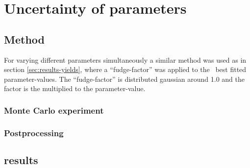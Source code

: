 \section{Uncertainty of parameters}

\subsection{Method}
For varying different parameters simultaneously a similar method was used as in section \ref{sec:results-yields}, where a ``fudge-factor'' was applied to the \eris\ best fitted parameter-values. The ``fudge-factor'' is distributed gaussian around 1.0 and the factor is the multiplied to the parameter-value.


\subsubsection{Monte Carlo experiment}
\subsubsection{Postprocessing}

\subsection{results}


